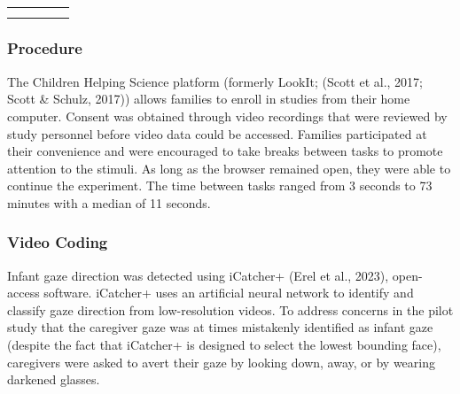\documentclass[
  english,
  man,floatsintext]{apa6}
\begin{document}
\begin{table}[!h]
{\begin{tabular}[t]{>{\centering\arraybackslash}p{1.8cm}>{\centering\arraybackslash}p{1.8cm}>{\raggedright\arraybackslash}p{4.0cm}>{\raggedright\arraybackslash}p{3.0cm}>{\raggedright\arraybackslash}p{3.0cm}}
\cellcolor[HTML]{A17BEA}{Social\newline Evaluation} & \cellcolor[HTML]{A17BEA}{Social\newline Congition} & \cellcolor[HTML]{A17BEA}{Animated shapes are shown to help or hinder each other's progress up a hill.} & \cellcolor[HTML]{A17BEA}{Null results.} & \cellcolor[HTML]{A17BEA}{None}\\
\cellcolor[HTML]{BFEAF7}{Numeracy} & \cellcolor[HTML]{BFEAF7}{Number\newline Representation} & \cellcolor[HTML]{BFEAF7}{Alternating streams of different quantities of dots.} & \cellcolor[HTML]{BFEAF7}{Preference for alternating at 12 but not 6 months.} & \cellcolor[HTML]{BFEAF7}{None}\\
\bottomrule
\end{tabular}}
\end{table}

\subsubsection{Procedure}\label{procedure}

The Children Helping Science platform (formerly LookIt; (Scott et al., 2017; Scott \& Schulz, 2017)) allows families to enroll in studies from their home computer.
Consent was obtained through video recordings that were reviewed by study personnel before video data could be accessed.
Families participated at their convenience and were encouraged to take breaks between tasks to promote attention to the stimuli.
As long as the browser remained open, they were able to continue the experiment.
The time between tasks ranged from 3 seconds to 73 minutes with a median of 11 seconds.

\subsubsection{Video Coding}\label{video-coding}

Infant gaze direction was detected using iCatcher+ (Erel et al., 2023), open-access software.
iCatcher+ uses an artificial neural network to identify and classify gaze direction from low-resolution videos.
To address concerns in the pilot study that the caregiver gaze was at times mistakenly identified as infant gaze (despite the fact that iCatcher+ is designed to select the lowest bounding face), caregivers were asked to avert their gaze by looking down, away, or by wearing darkened glasses.
\end{document}
